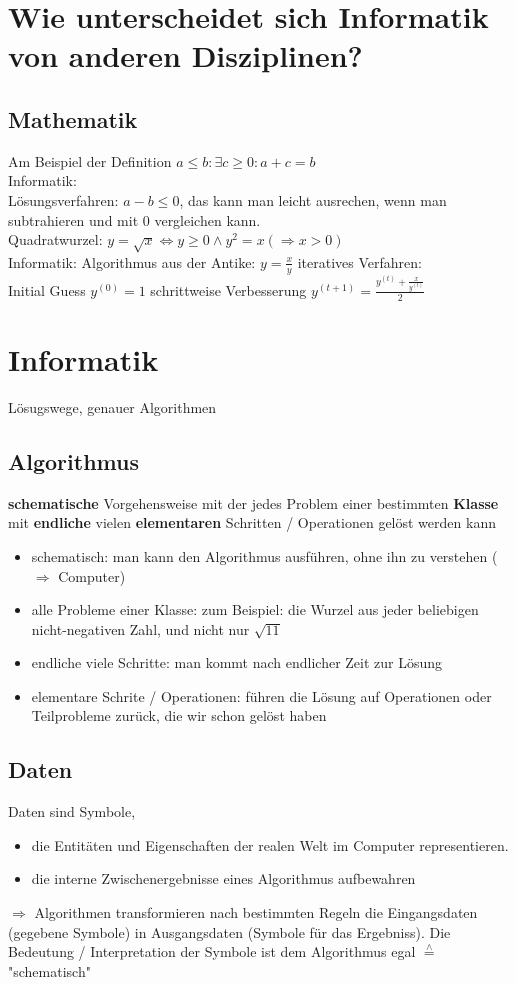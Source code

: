 \documentclass[a4paper]{scrartcl}
\newcommand{\estimates}{\overset{\scriptscriptstyle\wedge}{=}}%
\begin{document}
\section{Wie unterscheidet sich Informatik von anderen Disziplinen?}
\label{sec-2}
\subsection{Mathematik}
\label{sec-2-1}
Am Beispiel der Definition $a \leq b: \exists c \geq 0: a + c = b$ \\
   Informatik: \\
   Lösungsverfahren: $a - b \leq 0$, das kann man leicht ausrechen, wenn man subtrahieren und mit $0$ vergleichen kann. \\
   Quadratwurzel: $y = \sqrt{x} \Leftrightarrow y \geq 0 \wedge y^2 = x (\Rightarrow x > 0)$ \\
   Informatik: Algorithmus aus der Antike: $y = \frac{x}{y}$
iteratives Verfahren: \\
   Initial Guess $y^{(0)} = 1$
schrittweise Verbesserung $y^{(t+1)} = \frac{y^{(t)} + \frac{x}{y^{(t)}}}{2}$
\section{Informatik}
\label{sec-3}
Lösugswege, genauer Algorithmen
\subsection{Algorithmus}
\label{sec-3-1}
\textbf{schematische} Vorgehensweise mit der jedes Problem einer bestimmten \textbf{Klasse} mit \textbf{endliche} vielen \textbf{elementaren} Schritten / Operationen gelöst werden kann
\begin{itemize}
\item schematisch: man kann den Algorithmus ausführen, ohne ihn zu verstehen ($\Rightarrow$ Computer)
\item alle Probleme einer Klasse: zum Beispiel: die Wurzel aus jeder beliebigen nicht-negativen Zahl, und nicht nur $\sqrt{11}$
\item endliche viele Schritte: man kommt nach endlicher Zeit zur Lösung
\item elementare Schrite / Operationen: führen die Lösung auf Operationen oder Teilprobleme zurück, die wir schon gelöst haben
\end{itemize}
\subsection{Daten}
\label{sec-3-2}
Daten sind Symbole,
\begin{itemize}
\item die Entitäten und Eigenschaften der realen Welt im Computer representieren.
\item die interne Zwischenergebnisse eines Algorithmus aufbewahren
\end{itemize}
$\Rightarrow$ Algorithmen transformieren nach bestimmten Regeln die Eingangsdaten (gegebene Symbole) in Ausgangsdaten (Symbole für das Ergebniss).
Die Bedeutung / Interpretation der Symbole ist dem Algorithmus egal $\estimates$ "schematisch"
\end{document}
